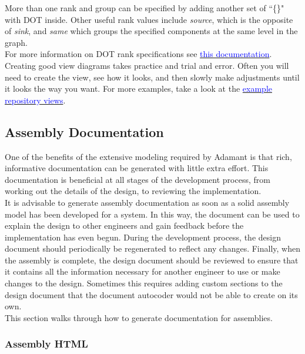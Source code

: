 More than one rank and group can be specified by adding another set of ``\{\}" with DOT inside. Other useful rank values include \textit{source}, which is the opposite of \textit{sink}, and \textit{same} which groups the specified components at the same level in the graph. \\

For more information on DOT rank specifications see \href{https://www.graphviz.org/doc/info/attrs.html#d:rank}{\textcolor{blue}{this documentation}}. \\

Creating good view diagrams takes practice and trial and error. Often you will need to create the view, see how it looks, and then slowly make adjustments until it looks the way you want. For more examples, take a look at the \href{https://github.com/lasp/adamant_example/tree/main/src/assembly/linux/views}{\textcolor{blue}{example repository views}}.

\subsection{Assembly Documentation} \label{Assembly Documentation}

One of the benefits of the extensive modeling required by Adamant is that rich, informative documentation can be generated with little extra effort. This documentation is beneficial at all stages of the development process, from working out the details of the design, to reviewing the implementation. \\

It is advisable to generate assembly documentation as soon as a solid assembly model has been developed for a system. In this way, the document can be used to explain the design to other engineers and gain feedback before the implementation has even begun. During the development process, the design document should periodically be regenerated to reflect any changes. Finally, when the assembly is complete, the design document should be reviewed to ensure that it contains all the information necessary for another engineer to use or make changes to the design. Sometimes this requires adding custom sections to the design document that the document autocoder would not be able to create on its own. \\

This section walks through how to generate documentation for assemblies.

\subsubsection{Assembly HTML}


